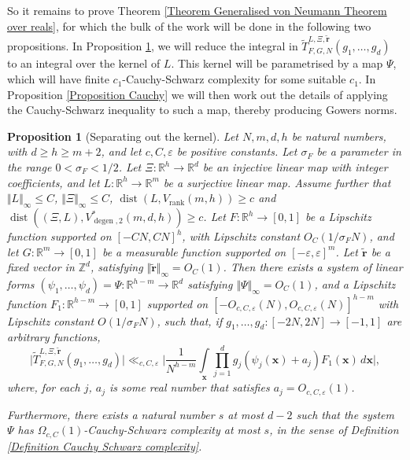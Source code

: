 \documentclass[12pt,a4paper,twoside,reqno]{amsart}
\newtheorem{Proposition}[Theorem]{Proposition}
\newcommand{\degen}{\operatorname{degen}}
\newcommand{\rank}{\operatorname{rank}}
\newcommand{\dist}{\operatorname{dist}}
\numberwithin{equation}{section}
\begin{document}
So it remains to prove Theorem \ref{Theorem Generalised von Neumann Theorem over reals}, for which the bulk of the work will be done in the following two propositions. In Proposition \ref{Proposition separating out the kernel}, we will reduce the integral in $\widetilde{T}_{F,G,N}^{L,\Xi,\widetilde{\mathbf{r}}}(g_1, \dots, g_d)$ to an integral over the kernel of $L$. This kernel will be parametrised by a map $\Psi$, which will have finite $c_1$-Cauchy-Schwarz complexity for some suitable $c_1$. In Proposition \ref{Proposition Cauchy} we will then work out the details of applying the Cauchy-Schwarz inequality to such a map, thereby producing Gowers norms. 

\begin{Proposition}[Separating out the kernel]
\label{Proposition separating out the kernel}
Let $N,m,d, h$ be natural numbers, with $d\geqslant h\geqslant m+2$, and let $c,C,\varepsilon$ be positive constants. Let $\sigma_F$ be a parameter in the range $0 <\sigma_F<1/2$. Let $\Xi:\mathbb{R}^h\rightarrow \mathbb{R}^d$ be an injective linear map with integer coefficients, and let $L:\mathbb{R}^h \longrightarrow \mathbb{R}^m$ be a surjective linear map. Assume further that $\Vert L \Vert_\infty \leqslant C$, $\Vert \Xi\Vert_\infty \leqslant C$, $\dist(L,V_{\rank}(m,h))\geqslant c$ and $\dist ((\Xi,L),V_{\degen,2}^\ast (m,d,h)) \geqslant c$. Let $F:\mathbb{R}^h\longrightarrow [0,1]$ be a Lipschitz function supported on $[- CN,CN]^h$, with Lipschitz constant $O_C(1/\sigma_F N)$, and let $G:\mathbb{R}^{m}\longrightarrow [0,1]$ be a measurable function supported on $[-\varepsilon,\varepsilon]^m$. Let $\widetilde{\mathbf{r}}$ be a fixed vector in $\mathbb{Z}^d$, satisfying $\Vert \widetilde{\mathbf{r}}\Vert_\infty = O_{C}(1)$. Then there exists a system of linear forms $(\psi_1,\dots,\psi_d) = \Psi:\mathbb{R}^{h-m}\longrightarrow \mathbb{R}^d$ satisfying $\Vert \Psi\Vert_\infty = O_C(1)$, and a Lipschitz function $F_1:\mathbb{R}^{h-m}\longrightarrow [0,1]$ supported on $[-O_{c,C,\varepsilon}(N),O_{c,C,\varepsilon}(N)]^{h-m}$ with Lipschitz constant $O(1/\sigma_F N)$, such that, if $g_1,\dots,g_d:[-2N,2N]\longrightarrow [-1,1]$ are arbitrary functions, 
\begin{equation}
\vert\widetilde{T}_{F,G,N}^{L,\Xi,\widetilde{\mathbf{r}}}(g_1,\dots,g_d)\vert\ll_{c,C,\varepsilon} \Big\vert\frac{1}{N^{h-m}}\int\limits_{\mathbf{x}} \prod\limits_{j=1}^d g_j(\psi_j(\mathbf{x}) + a_j)F_1(\mathbf{x}) \, d\mathbf{x}\Big\vert ,
\end{equation}
\noindent where, for each $j$, $a_j$ is some real number that satisfies $a_j = O_{c,C,\varepsilon}(1)$.

Furthermore, there exists a natural number $s$ at most $d-2$ such that the system $\Psi$ has $\Omega_{c,C}(1)$-Cauchy-Schwarz complexity at most $s$, in the sense of Definition \ref{Definition Cauchy Schwarz complexity}.
\end{Proposition}
\end{document}
